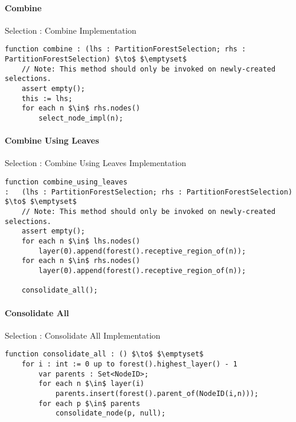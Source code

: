 \paragraph{Combine}

\begin{stulisting}[H]
\caption{Selection : Combine Implementation}
\begin{lstlisting}[style=Default]
function combine : (lhs : PartitionForestSelection; rhs : PartitionForestSelection) $\to$ $\emptyset$
	// Note: This method should only be invoked on newly-created selections.
	assert empty();
	this := lhs;
	for each n $\in$ rhs.nodes()
		select_node_impl(n);
\end{lstlisting}
\end{stulisting}

\paragraph{Combine Using Leaves}

\begin{stulisting}[H]
\caption{Selection : Combine Using Leaves Implementation}
\begin{lstlisting}[style=Default]
function combine_using_leaves
:	(lhs : PartitionForestSelection; rhs : PartitionForestSelection) $\to$ $\emptyset$
	// Note: This method should only be invoked on newly-created selections.
	assert empty();
	for each n $\in$ lhs.nodes()
		layer(0).append(forest().receptive_region_of(n));
	for each n $\in$ rhs.nodes()
		layer(0).append(forest().receptive_region_of(n));

	consolidate_all();
\end{lstlisting}
\end{stulisting}

\paragraph{Consolidate All}

\begin{stulisting}[H]
\caption{Selection : Consolidate All Implementation}
\begin{lstlisting}[style=Default]
function consolidate_all : () $\to$ $\emptyset$
	for i : int := 0 up to forest().highest_layer() - 1
		var parents : Set<NodeID>;
		for each n $\in$ layer(i)
			parents.insert(forest().parent_of(NodeID(i,n)));
		for each p $\in$ parents
			consolidate_node(p, null);
\end{lstlisting}
\end{stulisting}


